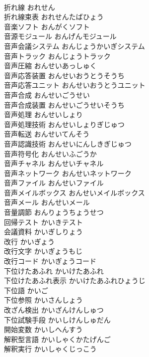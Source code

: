 \documentclass[8pt]{extreport}
\begin{document}
\begin{CJK}{UTF8}{min}
\\	折れ線	おれせん	
\\	折れ線束表	おれせんたばひょう	
\\	音楽ソフト	おんがくソフト	
\\	音源モジュール	おんげんモジュール	
\\	音声会議システム	おんじょうかいぎシステム	
\\	音声トラック	おんじょうトラック	
\\	音声圧縮	おんせいあっしゅく	
\\	音声応答装置	おんせいおうとうそうち	
\\	音声応答ユニット	おんせいおうとうユニット	
\\	音声合成	おんせいごうせい	
\\	音声合成装置	おんせいごうせいそうち	
\\	音声処理	おんせいしょり	
\\	音声処理技術	おんせいしょりぎじゅつ	
\\	音声転送	おんせいてんそう	
\\	音声認識技術	おんせいにんしきぎじゅつ	
\\	音声符号化	おんせいふごうか	
\\	音声チャネル	おんせいチャネル	
\\	音声ネットワーク	おんせいネットワーク	
\\	音声ファイル	おんせいファイル	
\\	音声メイルボックス	おんせいメイルボックス	
\\	音声メール	おんせいメール	
\\	音量調節	おんりょうちょうせつ	
\\	回帰テスト	かいきテスト	
\\	会議資料	かいぎしりょう	
\\	改行	かいぎょう	
\\	改行文字	かいぎょうもじ	
\\	改行コード	かいぎょうコード	
\\	下位けたあふれ	かいけたあふれ	
\\	下位けたあふれ表示	かいけたあふれひょうじ	
\\	下位語	かいご	
\\	下位参照	かいさんしょう	
\\	改ざん検出	かいざんけんしゅつ	
\\	下位試験手段	かいしけんしゅだん	
\\	開始変数	かいしへんすう	
\\	解釈型言語	かいしゃくかたげんご	
\\	解釈実行	かいしゃくじっこう	

\end{CJK}
\end{document}
